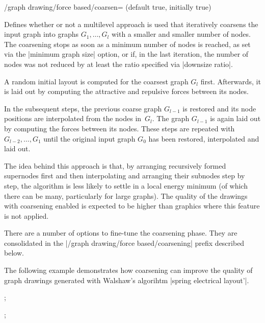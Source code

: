 \begin{key}{/graph drawing/force based/coarsen=
  (default true, initially true)}

  Defines whether or not a multilevel approach is used that
  iteratively coarsens the input graph into graphs $G_1,\dots,G_l$ with 
  a smaller and smaller number of nodes. The coarsening stops as soon as
  a minimum number of nodes is reached, as set via the 
  |minimum graph size| option, or if, in the last iteration, the 
  number of nodes was not reduced by at least the ratio specified via 
  |downsize ratio|. 

  A random initial layout is computed for the coarsest graph $G_l$ first.
  Afterwards, it is laid out by computing the attractive and repulsive
  forces between its nodes. 
  
  In the subsequent steps, the previous coarse graph $G_{l-1}$ is 
  restored and its node positions are interpolated from the nodes
  in~$G_l$. The graph $G_{l-1}$ is again laid out by computing the forces
  between its nodes. These steps are repeated with $G_{l-2},\dots,G_1$ until 
  the original input graph $G_0$ has been restored, interpolated 
  and laid out.

  The idea behind this approach is that, by arranging recursively 
  formed supernodes first and then interpolating and arranging their
  subnodes step by step, the algorithm is less likely to settle in a
  local energy minimum (of which there can be many, particularly for
  large graphs). The quality of the drawings with coarsening enabled is
  expected to be higher than graphics where this feature is not applied.

  There are a number of options to fine-tune the coarsening phase.
  They are consolidated in the |/graph drawing/force based/coarsening|
  prefix described below.

  The following example demonstrates how coarsening can improve the
  quality of graph drawings generated with Walshaw's algorihtm 
  |spring electrical layout'|.
  \begin{codeexample}[width=5cm]
\tikz {};

\tikz {};
  \end{codeexample}
\end{key}

